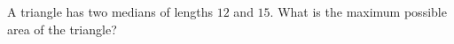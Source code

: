 A triangle has two medians of lengths $12$ and $15$. What is the maximum possible area of the triangle?
